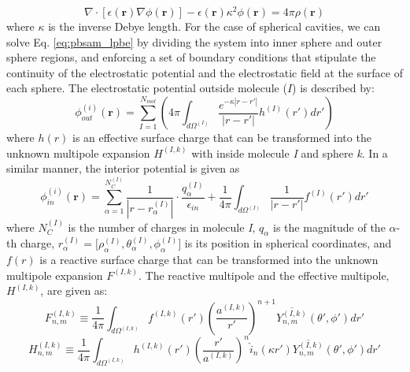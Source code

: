 \documentclass[journal=jpcbfk, manuscript=article]{achemso}
\begin{document}
\begin{equation}
\nabla \cdot [ \epsilon(\mathbf{r}) \nabla \phi (\mathbf{r}) ] - \epsilon (\mathbf{r}) \kappa^2 \phi(\mathbf{r}) = 4 \pi \rho(\mathbf{r})
	\label{eq:pbsam_lpbe}
\end{equation}
%
where $\kappa$ is the inverse Debye length. For the case of spherical cavities, we can solve Eq. \ref{eq:pbsam_lpbe} by dividing the system into inner sphere and outer sphere regions, and enforcing a set of boundary conditions that stipulate the continuity of the electrostatic potential and the electrostatic field at the surface of each sphere. The electrostatic potential outside molecule ($I$) is described by:
%
\begin{equation}
\phi_{out}^{(i)} (\mathbf{r})  = \sum_{I=1}^{N_{mol}} \left( 4 \pi \int_{d\Omega^{(I)}} \frac{e^{-\kappa | r - r'|}}{|r - r'|} h^{(I)} (r') dr'  \right)
\label{eq:pbsam_phi_in}
\end{equation}
%
where \(h(r)\) is an effective surface charge that can be transformed into the unknown multipole expansion \(H^{(I,k)}\) with inside molecule \textit{I} and sphere \textit{k}. In a similar manner, the interior potential is given as
%
\begin{equation}
\phi_{in}^{(i)} (\mathbf{r})  = \sum_{\alpha = 1}^{N_C^{(I)}} \frac{1}{|r-r_{\alpha}^{(I)}|} \cdot \frac{q_\alpha^{(I)}} {\epsilon_{in}} + \frac{1}{4\pi} \int_{d\Omega^{(I)}} \frac{1}{|r - r'|} f^{(I)} (r') dr' 
\label{eq:pbsam_phi_out}
\end{equation}
%
where \( N_C^{(I)}\) is the number of charges in molecule \textit{I}, \( q_\alpha\) 
is the magnitude of the \(\alpha\)-th charge, \( r_\alpha^{(I)} = \Big[\rho_{\alpha}^{(I)} , \theta_{\alpha}^{(I)} , \phi_{\alpha}^{(I)} \Big]\) is its position in spherical 
coordinates, and \(f(r)\) is a reactive surface charge that can
be transformed into the unknown multipole expansion \(F^{(I,k)}\). The reactive multipole and the effective multipole, \(H^{(I,k)}\), are given as:
%
\begin{equation}
F_{n,m}^{(I,k)} \equiv  \frac{1}{4\pi} \int_{d\Omega^{(I,k)}} f^{(I,k)}(r') \left (  \frac{ a^{(I,k)}}  {r'} \right ) ^{n+1} \overline{ Y^{(I,k)}_{n,m}} (\theta' , \phi') dr'
\label{eq:fmat}
\end{equation}
%
\begin{equation}
H_{n,m}^{(I,k)} \equiv  \frac{1}{4\pi} \int_{d\Omega^{(I,k)}} h^{(I,k)}(r') \left (  \frac{ r'}{a^{(I,k)}} \right ) ^{n} \hat{i}_n(\kappa r') \overline{ Y^{(I,k)}_{n,m}} (\theta' , \phi') dr'
\label{eq:hmat}
\end{equation}
\end{document}
